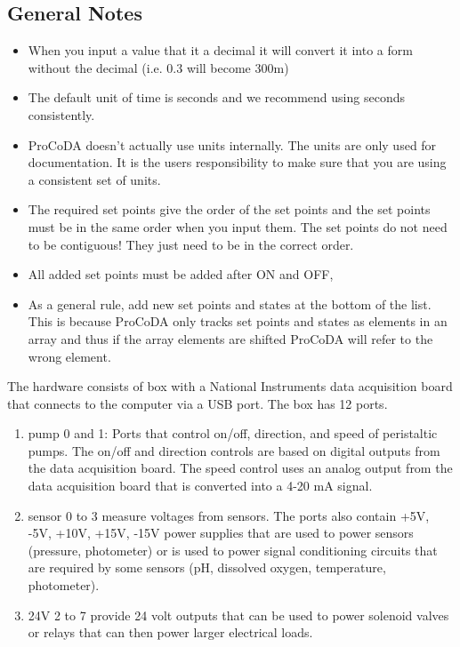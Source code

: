 \documentclass[letterpaper,10pt,english]{sphinxmanual}
\begin{document}
\subsection{General Notes}
\label{\detokenize{ProCoDA/ProCoDA:general-notes}}\begin{itemize}
\item {} 
When you input a value that it a decimal it will convert it into a form without the decimal (i.e. 0.3 will become 300m)

\item {} 
The default unit of time is seconds and we recommend using seconds consistently.

\item {} 
ProCoDA doesn’t actually use units internally. The units are only used for documentation. It is the users responsibility to make sure that you are using a consistent set of units.

\item {} 
The required set points give the order of the set points and the set points must be in the same order when you input them. The set points do not need to be contiguous! They just need to be in the correct order.

\item {} 
All added set points must be added after ON and OFF,

\item {} 
As a general rule, add new set points and states at the bottom of the list. This is because ProCoDA only tracks set points and states as elements in an array and thus if the array elements are shifted ProCoDA will refer to the wrong element.

\end{itemize}

The hardware consists of box with a National Instruments data acquisition board that connects to the computer via a USB port. The box has 12 ports.
\begin{enumerate}
\item {} 
pump 0 and 1: Ports that control on/off, direction, and speed of peristaltic pumps. The on/off and direction controls are based on digital outputs from the data acquisition board. The speed control uses an analog output from the data acquisition board that is converted into a 4-20 mA signal.

\item {} 
sensor 0 to 3 measure voltages from sensors. The ports also contain +5V, -5V, +10V, +15V, -15V power supplies that are used to power sensors (pressure, photometer) or is used to power signal conditioning circuits that are required by some sensors (pH, dissolved oxygen, temperature, photometer).

\item {} 
24V 2 to 7 provide 24 volt outputs that can be used to power solenoid valves or relays that can then power larger electrical loads.

\end{enumerate}
\end{document}
